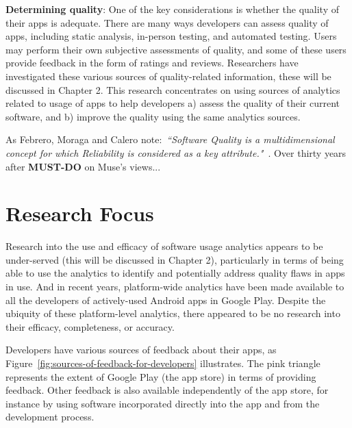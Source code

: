 
\medskip
\textbf{Determining quality}: One of the key considerations is whether the quality of their apps is adequate. There are many ways developers can assess quality of apps, including static analysis, in-person testing, and automated testing. Users may perform their own subjective assessments of quality, and some of these users provide feedback in the form of ratings and reviews. Researchers have investigated these various sources of quality-related information, these will be discussed in Chapter 2. This research concentrates on using sources of analytics related to usage of apps to help developers a) assess the quality of their current software, and b) improve the quality using the same analytics sources.

As Febrero, Moraga and Calero note:~\emph{``Software Quality is a multidimensional concept for which Reliability is considered as a key attribute."}~\citep[p.224]{febrero2017_software_reliability_as_user_perception}.
Over thirty years after \textbf{MUST-DO} on Muse's views...

\section{Research Focus}
Research into the use and efficacy of software usage analytics appears to be under-served (this will be discussed in Chapter 2), particularly in terms of being able to use the analytics to identify and potentially address quality flaws in apps in use. And in recent years, platform-wide analytics have been made available to all the developers of actively-used Android apps in Google Play. Despite the ubiquity of these platform-level analytics, there appeared to be no research into their efficacy, completeness, or accuracy.

Developers have various sources of feedback about their apps, as Figure~\ref{fig:sources-of-feedback-for-developers} illustrates. The pink triangle represents the extent of Google Play (the app store) in terms of providing feedback. Other feedback is also available independently of the app store, for instance by using software incorporated directly into the app and from the development process.


